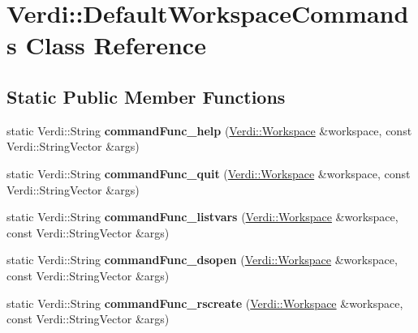 \hypertarget{class_verdi_1_1_default_workspace_commands}{\section{\-Verdi\-:\-:\-Default\-Workspace\-Commands \-Class \-Reference}
\label{class_verdi_1_1_default_workspace_commands}
}
\subsection*{\-Static \-Public \-Member \-Functions}
\begin{DoxyCompactItemize}
\item 
\hypertarget{class_verdi_1_1_default_workspace_commands_a563858c0fd5b1213dc692c50d3a1fc54}{static \-Verdi\-::\-String {\bfseries command\-Func\-\_\-help} (\hyperlink{class_verdi_1_1_workspace}{\-Verdi\-::\-Workspace} \&workspace, const \-Verdi\-::\-String\-Vector \&args)}\label{class_verdi_1_1_default_workspace_commands_a563858c0fd5b1213dc692c50d3a1fc54}

\item 
\hypertarget{class_verdi_1_1_default_workspace_commands_a22caf7e259e9c42e078e19811806560a}{static \-Verdi\-::\-String {\bfseries command\-Func\-\_\-quit} (\hyperlink{class_verdi_1_1_workspace}{\-Verdi\-::\-Workspace} \&workspace, const \-Verdi\-::\-String\-Vector \&args)}\label{class_verdi_1_1_default_workspace_commands_a22caf7e259e9c42e078e19811806560a}

\item 
\hypertarget{class_verdi_1_1_default_workspace_commands_aac03ffd2d8d35280c2061c4ac6b84642}{static \-Verdi\-::\-String {\bfseries command\-Func\-\_\-listvars} (\hyperlink{class_verdi_1_1_workspace}{\-Verdi\-::\-Workspace} \&workspace, const \-Verdi\-::\-String\-Vector \&args)}\label{class_verdi_1_1_default_workspace_commands_aac03ffd2d8d35280c2061c4ac6b84642}

\item 
\hypertarget{class_verdi_1_1_default_workspace_commands_a5608196e6ba334e1650da941a7551d2c}{static \-Verdi\-::\-String {\bfseries command\-Func\-\_\-dsopen} (\hyperlink{class_verdi_1_1_workspace}{\-Verdi\-::\-Workspace} \&workspace, const \-Verdi\-::\-String\-Vector \&args)}\label{class_verdi_1_1_default_workspace_commands_a5608196e6ba334e1650da941a7551d2c}

\item 
\hypertarget{class_verdi_1_1_default_workspace_commands_a4f740f77c39ce2d57de9125c25e1b8eb}{static \-Verdi\-::\-String {\bfseries command\-Func\-\_\-rscreate} (\hyperlink{class_verdi_1_1_workspace}{\-Verdi\-::\-Workspace} \&workspace, const \-Verdi\-::\-String\-Vector \&args)}\label{class_verdi_1_1_default_workspace_commands_a4f740f77c39ce2d57de9125c25e1b8eb}


\end{DoxyCompactItemize}

